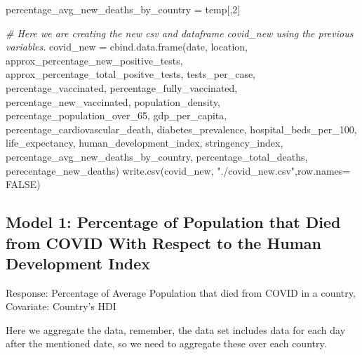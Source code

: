 \documentclass[
  12pt,
]{article}
\newenvironment{Shaded}{\begin{snugshade}}{\end{snugshade}}
\newcommand{\AttributeTok}[1]{\textcolor[rgb]{0.77,0.63,0.00}{#1}}
\newcommand{\CommentTok}[1]{\textcolor[rgb]{0.56,0.35,0.01}{\textit{#1}}}
\newcommand{\ConstantTok}[1]{\textcolor[rgb]{0.00,0.00,0.00}{#1}}
\newcommand{\DecValTok}[1]{\textcolor[rgb]{0.00,0.00,0.81}{#1}}
\newcommand{\FunctionTok}[1]{\textcolor[rgb]{0.00,0.00,0.00}{#1}}
\newcommand{\NormalTok}[1]{#1}
\newcommand{\OtherTok}[1]{\textcolor[rgb]{0.56,0.35,0.01}{#1}}
\newcommand{\SpecialCharTok}[1]{\textcolor[rgb]{0.00,0.00,0.00}{#1}}
\newcommand{\StringTok}[1]{\textcolor[rgb]{0.31,0.60,0.02}{#1}}
\begin{document}
\begin{Shaded}
\begin{Highlighting}[]
\NormalTok{percentage\_avg\_new\_deaths\_by\_country }\OtherTok{=}\NormalTok{ temp[,}\DecValTok{2}\NormalTok{]}

\CommentTok{\# Here we are creating the new csv and dataframe covid\_new using the previous variables.}
\NormalTok{covid\_new }\OtherTok{=} \FunctionTok{cbind.data.frame}\NormalTok{(date, location, approx\_percentage\_new\_positive\_tests, approx\_percentage\_total\_positve\_tests, tests\_per\_case, percentage\_vaccinated, percentage\_fully\_vaccinated, percentage\_new\_vaccinated, population\_density, percentage\_population\_over\_65, gdp\_per\_capita, percentage\_cardiovascular\_death, diabetes\_prevalence, hospital\_beds\_per\_100, life\_expectancy, human\_development\_index, stringency\_index, percentage\_avg\_new\_deaths\_by\_country, percentage\_total\_deaths, perecentage\_new\_deaths)}
\FunctionTok{write.csv}\NormalTok{(covid\_new, }\StringTok{"./covid\_new.csv"}\NormalTok{,}\AttributeTok{row.names=} \ConstantTok{FALSE}\NormalTok{)}
\end{Highlighting}
\end{Shaded}

\hypertarget{model-1-percentage-of-population-that-died-from-covid-with-respect-to-the-human-development-index}{%
\subsection{Model 1: Percentage of Population that Died from COVID With
Respect to the Human Development
Index}\label{model-1-percentage-of-population-that-died-from-covid-with-respect-to-the-human-development-index}}

Response: Percentage of Average Population that died from COVID in a
country, Covariate: Country's HDI

Here we aggregate the data, remember, the data set includes data for
each day after the mentioned date, so we need to aggregate these over
each country.

\begin{Shaded}
\end{Shaded}
\end{document}

